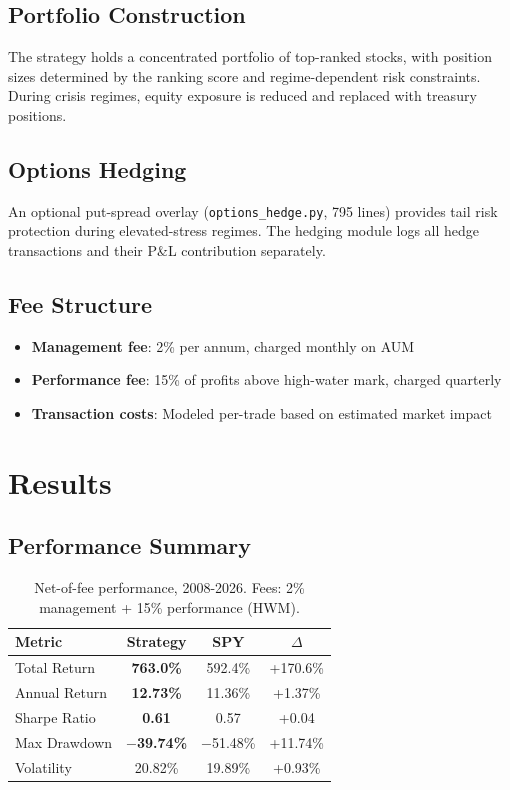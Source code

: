 \documentclass[11pt]{article}
\begin{document}
\subsection{Portfolio Construction}
The strategy holds a concentrated portfolio of top-ranked stocks, with position sizes determined by the ranking score and regime-dependent risk constraints. During crisis regimes, equity exposure is reduced and replaced with treasury positions.

\subsection{Options Hedging}
An optional put-spread overlay (\texttt{options\_hedge.py}, 795 lines) provides tail risk protection during elevated-stress regimes. The hedging module logs all hedge transactions and their P\&L contribution separately.

\subsection{Fee Structure}
\begin{itemize}[nosep]
    \item \textbf{Management fee}: 2\% per annum, charged monthly on AUM
    \item \textbf{Performance fee}: 15\% of profits above high-water mark, charged quarterly
    \item \textbf{Transaction costs}: Modeled per-trade based on estimated market impact
\end{itemize}

\section{Results}

\subsection{Performance Summary}

\begin{table}[H]
\centering
\begin{tabular}{lccc}
\toprule
\textbf{Metric} & \textbf{Strategy} & \textbf{SPY} & \textbf{$\Delta$} \\
\midrule
Total Return & \textbf{763.0\%} & 592.4\% & +170.6\% \\
Annual Return & \textbf{12.73\%} & 11.36\% & +1.37\% \\
Sharpe Ratio & \textbf{0.61} & 0.57 & +0.04 \\
Max Drawdown & \textbf{$-$39.74\%} & $-$51.48\% & +11.74\% \\
Volatility & 20.82\% & 19.89\% & +0.93\% \\
\bottomrule
\end{tabular}
\caption{Net-of-fee performance, 2008-2026. Fees: 2\% management + 15\% performance (HWM).}
\end{table}
\end{document}
